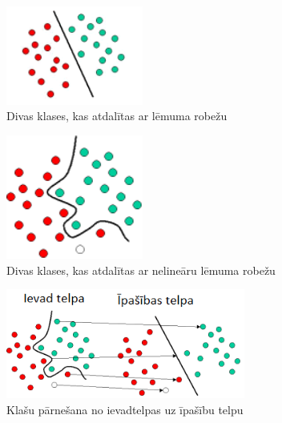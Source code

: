 \documentclass[12pt,paper=A4]{report}
\begin{document}
 \begin{figure}[H] \centering
\includegraphics[width=0.40\textwidth]{SVMIntro1} 
\caption{Divas klases, kas atdalītas ar lēmuma robežu \cite{http://www.statsoft.com/Textbook/Support-Vector-Machines}}  \label{svm1} 
\end{figure}

 
  \begin{figure}[H] \centering
\includegraphics[width=0.40\textwidth]{SVMIntro2} 
\caption{Divas klases, kas atdalītas ar nelineāru lēmuma robežu \cite{http://www.statsoft.com/Textbook/Support-Vector-Machines}}  \label{svm2} 
\end{figure}

 
  \begin{figure}[H] \centering
\includegraphics[width=0.70\textwidth]{SVMIntro3} 
\caption{Klašu pārnešana no ievadtelpas uz īpašību telpu \cite{http://www.statsoft.com/Textbook/Support-Vector-Machines}}  \label{svm3} 
\end{figure}
\end{document}
